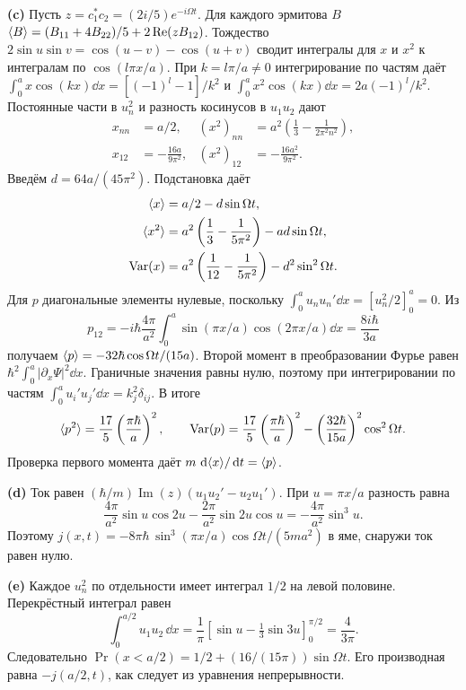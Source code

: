 \documentclass[11pt,a4paper]{article}
\begin{document}
\textbf{(c)} Пусть \(z=c_1^*c_2=(2i/5)e^{-i\Omega t}\).
Для каждого эрмитова \(B\)
\(\langle B\rangle=(B_{11}+4B_{22})/5+2\operatorname{Re}(zB_{12})\).
Тождество \(2\sin u\sin v=\cos(u-v)-\cos(u+v)\) сводит интегралы
для \(x\) и \(x^2\) к интегралам по \(\cos(l\pi x/a)\).
При \(k=l\pi/a\ne0\) интегрирование по частям даёт
\(\int_0^a x\cos(kx)\dd x=[(-1)^l-1]/k^2\) и
\(\int_0^a x^2\cos(kx)\dd x=2a(-1)^l/k^2\).
Постоянные части в \(u_n^2\) и разность косинусов в
\(u_1u_2\) дают
\begin{align*}
 x_{nn}&=a/2,& (x^2)_{nn}&=a^2\left(\frac13-\frac{1}{2\pi^2 n^2}\right),\\
 x_{12}&=-\frac{16a}{9\pi^2},& (x^2)_{12}&=-\frac{16a^2}{9\pi^2}.
\end{align*}
Введём \(d=64a/(45\pi^2)\). Подстановка даёт
\begin{align*}
 \langle x\rangle&=a/2-d\sin\Omega t,\\
 \langle x^2\rangle&=a^2\left(\frac13-\frac1{5\pi^2}\right)-ad\sin\Omega t,\\
 \operatorname{Var}(x)&=a^2\left(\frac1{12}-\frac1{5\pi^2}\right)-d^2\sin^2\Omega t .
\end{align*}
Для \(p\) диагональные элементы нулевые, поскольку
\(\int_0^a u_n u_n'\dd x=[u_n^2/2]_0^a=0\). Из
\[
 p_{12}=-i\hbar\frac{4\pi}{a^2}
             \int_0^a\sin(\pi x/a)\cos(2\pi x/a)\dd x
        =\frac{8i\hbar}{3a}
\]
получаем \(\langle p\rangle=-32\hbar\cos\Omega t/(15a)\).
Второй момент в преобразовании Фурье равен
\(\hbar^2\int_0^a|\partial_x\Psi|^2\dd x\).
Граничные значения равны нулю, поэтому при интегрировании по
частям \(\int_0^a u_i'u_j'\dd x=k_j^2\delta_{ij}\).
В итоге
\[
 \langle p^2\rangle=\frac{17}{5}\left(\frac{\pi\hbar}{a}\right)^2,\qquad
 \operatorname{Var}(p)=\frac{17}{5}\left(\frac{\pi\hbar}{a}\right)^2
                    -\left(\frac{32\hbar}{15a}\right)^2\cos^2\Omega t .
\]
Проверка первого момента даёт \(m\,\mathop{}\!\mathrm{d}\langle x\rangle/\mathop{}\!\mathrm{d} t=\langle p\rangle\).

\textbf{(d)} Ток равен
\((\hbar/m)\operatorname{Im}(z)(u_1u_2'-u_2u_1')\).
При \(u=\pi x/a\) разность равна
\[
 \frac{4\pi}{a^2}\sin u\cos 2u-\frac{2\pi}{a^2}\sin 2u\cos u
 =-\frac{4\pi}{a^2}\sin^3u.
\]
Поэтому \(j(x,t)=-8\pi\hbar\,\sin^3(\pi x/a)\cos\Omega t/(5ma^2)\)
в яме, снаружи ток равен нулю.

\textbf{(e)} Каждое \(u_n^2\) по отдельности имеет интеграл \(1/2\)
на левой половине. Перекрёстный интеграл равен
\[
 \int_0^{a/2}u_1u_2\,\dd x
 =\frac1\pi[\sin u-\tfrac13\sin 3u]_0^{\pi/2}=\frac4{3\pi}.
\]
Следовательно \(\Pr(x<a/2)=1/2+(16/(15\pi))\sin\Omega t\).
Его производная равна \(-j(a/2,t)\), как следует из уравнения
непрерывности.
\end{document}

